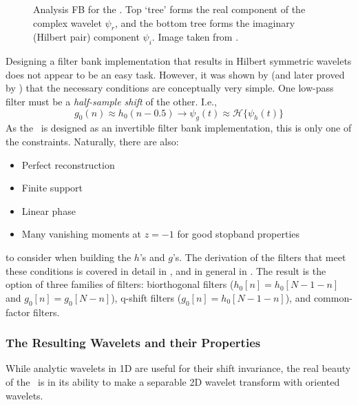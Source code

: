   \begin{figure}
    \centering
      \caption[Analysis FB for the \DTCWT]
              {Analysis FB for the \DTCWT\@. Top `tree' forms the real
              component of the complex wavelet $\psi_r$, and the bottom tree forms the
              imaginary (Hilbert pair) component $\psi_i$. Image taken from
              \citep{selesnick_dual-tree_2005}.}
      \label{fig:dtcwt_1d_fb}
  \end{figure}

  Designing a filter bank implementation that results in Hilbert symmetric
  wavelets does not appear to be an easy task. However, it was shown
  by \citet{kingsbury_image_1999} (and later proved by
  \citet{selesnick_hilbert_2001}) that the necessary conditions are
  conceptually very simple. One low-pass filter must be a \emph{half-sample shift} of
  the other. I.e.,\ 
  \begin{equation}
    g_0(n) \approx h_0(n-0.5) \rightarrow \psi_g(t) \approx
    \mathcal{H}\{\psi_h(t)\}
  \end{equation}
  As the \DTCWT\ is designed as an invertible filter bank implementation, this
  is only one of the constraints. Naturally, there are also:
  \begin{itemize}
    \item Perfect reconstruction
    \item Finite support
    \item Linear phase
    \item Many vanishing moments at $z=-1$ for good stopband properties
  \end{itemize}
  to consider when building the $h$'s and $g$'s.
  The derivation of the filters that meet these conditions is covered in
  detail in \citep{kingsbury_complex_2001, kingsbury_design_2003}, and in
  general in \citep{selesnick_dual-tree_2005}. The result is the
  option of three families of filters:  biorthogonal filters ($h_0[n] =
  h_0[N-1-n]$ and $g_0[n] = g_0[N-n]$), q-shift filters ($g_0[n]
  = h_0[N-1-n]$), and common-factor filters.

\subsubsection{The Resulting Wavelets and their Properties}
  While analytic wavelets in 1D are useful for their shift invariance, the real
  beauty of the \DTCWT\ is in its ability to make a separable 2D wavelet
  transform with oriented wavelets. 
  
